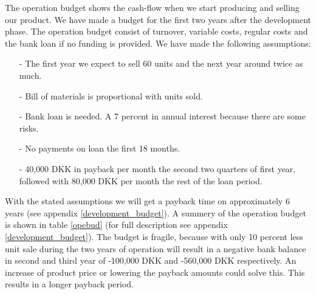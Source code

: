 The operation budget shows the cash-flow when we start producing and selling our product. We have made a budget for the first two years after the development phase. The operation budget consist of turnover, variable costs, regular costs and the bank loan if no funding is provided. We have made the following assumptions:
\begin{itemize}
\item[-] The first year we expect to sell 60 units and the next year around twice as much.
\item[-] Bill of materials is proportional with units sold.
\item[-] Bank loan is needed. A 7 percent in annual interest because there are some risks.
\item[-] No payments on loan the first 18 months.
\item[-] 40,000 DKK in payback per month the second two quarters of first year, followed with 80,000 DKK per month the rest of the loan period.
\end{itemize}
With the stated assumptions we will get a payback time on approximately 6 years (see appendix \ref{development_budget}).
A summery of the operation budget is shown in table \ref{opebud} (for full description see appendix \ref{development_budget}).
The budget is fragile, because with only 10 percent less unit sale during the two years of operation will result in a negative bank balance in second and third year of -100,000 DKK and -560,000 DKK respectively. An increase of product price or lowering the payback amounts could solve this. This results in a longer payback period.

